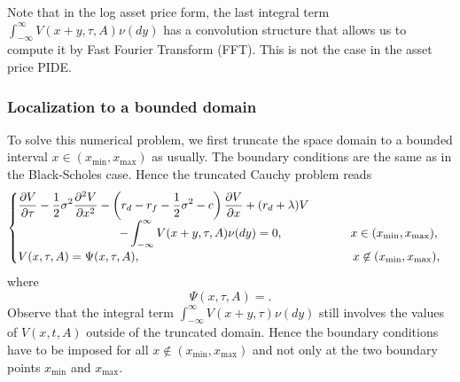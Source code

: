 Note that in the log asset price form, the last integral term $\int_{-\infty}^\infty V(x+y,\tau,A)\nu(dy)$ has a convolution structure that allows us to compute it by Fast Fourier Transform (FFT). This is not the case in the asset price PIDE.

\subsubsection{Localization to a bounded domain}
To solve this numerical problem, we first truncate the space domain to a bounded interval $x\in(x_{\min},x_{\max})$ as usually. The boundary conditions are the same as in the Black-Scholes case. Hence the truncated Cauchy problem reads
$$\begin{cases}
\displaystyle{\frac{\partial V}{\partial \tau}-\frac{1}{2}\sigma^2\frac{\partial^2V}{\partial x^2}-\left(r_d-r_f-\frac{1}{2}\sigma^2-c\right)\frac{\partial V}{\partial x}+(r_d+\lambda) V} \\
\hspace{3cm}\displaystyle{-\int_{-\infty}^\infty V(x+y,\tau,A)\nu(dy) = 0}, \hspace{2cm}x\in(x_{\min},x_{\max}),\\
V(x,\tau,A) = \Psi(x,\tau,A), \hspace{6.3cm} x \not\in (x_{\min},x_{\max}),
\end{cases}$$
where $$ \Psi(x,\tau,A) = .$$
Observe that the integral term $\int_{-\infty}^\infty V(x+y,\tau)\nu(dy)$ still involves the values of $V(x,t,A)$ outside of the truncated domain. Hence the boundary conditions have to be imposed for all $x\not\in(x_{\min},x_{\max})$ and not only at the two boundary points $x_{\min}$ and $x_{\max}$.

